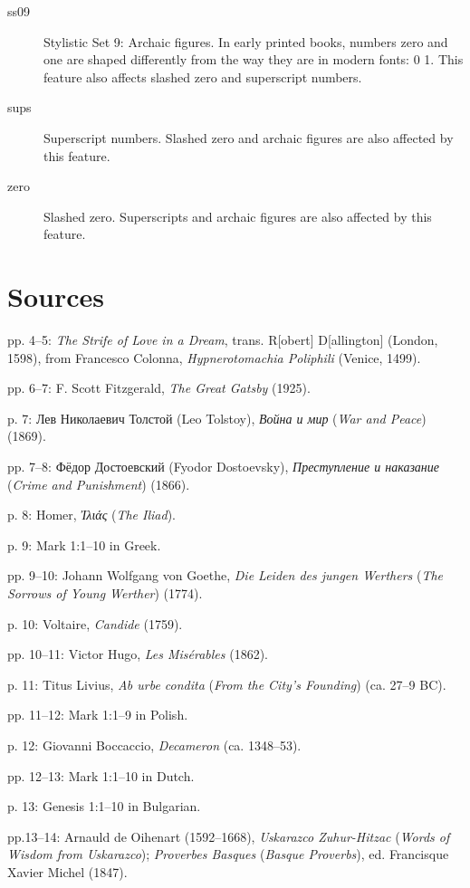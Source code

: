 \documentclass[12pt]{book}
\begin{document}
\begin{description}
\item[ss09] Stylistic Set 9: Archaic figures. In early printed books,
  numbers zero and one are shaped differently from the way they are in
  modern fonts: {0 1}. This feature
  also affects slashed zero and superscript numbers.

\item[sups] Superscript numbers. Slashed zero and archaic figures are also affected by this feature.

\item[zero] Slashed zero. Superscripts and archaic figures are also affected by this feature.

\end{description}

\section*{Sources}
\begin{hangparas}{.25in}{1}
pp. 4–5: \textit{The Strife of Love in a Dream}, trans. R[obert]
D[allington] (London, 1598), from Francesco Colonna,
\textit{Hypnerotomachia Poliphili} (Venice, 1499).

pp. 6–7: F. Scott Fitzgerald, \textit{The Great Gatsby} (1925).

p. 7: Лев Николаевич Толстой (Leo Tolstoy), \textit{Война и мир} (\textit{War and Peace}) (1869).

pp. 7–8:  Фёдор Достоевский (Fyodor Dostoevsky), \textit{Преступление и наказание} (\textit{Crime and Punishment}) (1866).

p. 8: Homer, \textit{Ἰλιάς} (\textit{The Iliad}).

p. 9: Mark 1:1–10 in Greek.

pp. 9–10: Johann Wolfgang von Goethe, \textit{Die Leiden des jungen Werthers}
(\textit{The Sorrows of Young Werther}) (1774).

p. 10: Voltaire, \textit{Candide} (1759).

pp. 10–11: Victor Hugo, \textit{Les Misérables} (1862).

p. 11: Titus Livius, \textit{Ab urbe condita} (\textit{From the City's
  Founding}) (ca. 27–9 BC).

pp. 11–12: Mark 1:1–9 in Polish.

p. 12: Giovanni Boccaccio, \textit{Decameron} (ca. 1348–53).

pp. 12–13: Mark 1:1–10 in Dutch.

p. 13: Genesis 1:1–10 in Bulgarian.

pp.13–14: Arnauld de Oihenart (1592–1668), \textit{Uskarazco Zuhur-Hitzac}
(\textit{Words of Wisdom from Uskarazco}); \textit{Proverbes Basques}
(\textit{Basque Proverbs}), ed. Francisque Xavier Michel (1847).
\end{hangparas}
\end{document}
